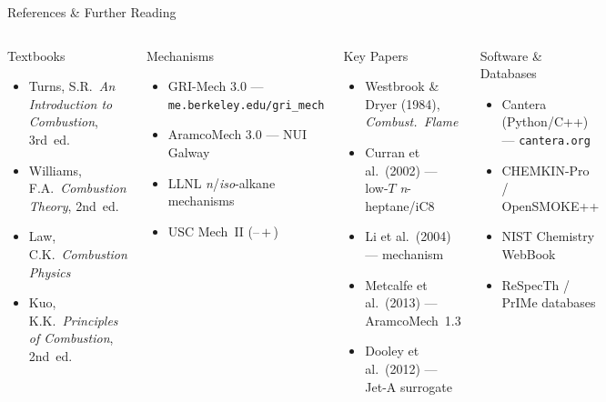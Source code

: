 \documentclass[aspectratio=169,10pt]{beamer}
\begin{document}
\begin{frame}{References \& Further Reading}
  \begin{columns}[t]
    \begin{block}{Textbooks}
      \begin{itemize}
        \item Turns, S.R.\ \textit{An Introduction to Combustion}, 3rd~ed.
        \item Williams, F.A.\ \textit{Combustion Theory}, 2nd~ed.
        \item Law, C.K.\ \textit{Combustion Physics}
        \item Kuo, K.K.\ \textit{Principles of Combustion}, 2nd~ed.
      \end{itemize}
    \end{block}
    \begin{exampleblock}{Mechanisms}
      \begin{itemize}
        \item GRI-Mech 3.0 --- \texttt{me.berkeley.edu/gri\_mech}
        \item AramcoMech 3.0 --- NUI Galway
        \item LLNL \textit{n}/\textit{iso}-alkane mechanisms
        \item USC Mech~II (--\,$+$\,)
      \end{itemize}
    \end{exampleblock}
    \begin{block}{Key Papers}
      \begin{itemize}
        \item Westbrook \& Dryer (1984), \textit{Combust.\ Flame}
        \item Curran et al.\ (2002) --- low-$T$ \textit{n}-heptane/iC8
        \item Li et al.\ (2004) ---  mechanism
        \item Metcalfe et al.\ (2013) --- AramcoMech~1.3
        \item Dooley et al.\ (2012) --- Jet-A surrogate
      \end{itemize}
    \end{block}
    \begin{alertblock}{Software \& Databases}
      \begin{itemize}
        \item Cantera (Python/C++) --- \texttt{cantera.org}
        \item CHEMKIN-Pro / OpenSMOKE++
        \item NIST Chemistry WebBook
        \item ReSpecTh / PrIMe databases
      \end{itemize}
    \end{alertblock}
  \end{columns}
\end{frame}
\end{document}
